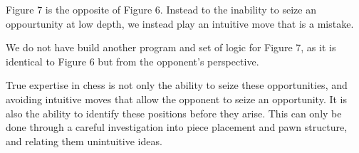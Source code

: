 \documentclass{article}
\begin{document}
Figure 7 is the opposite of Figure 6. Instead to the inability to seize an oppourtunity at low depth, we instead play an intuitive move that is a mistake.

We do not have build another program and set of logic for Figure 7, as it is identical to Figure 6 but from the opponent's perspective.

True expertise in chess is not only the ability to seize these opportunities, and avoiding intuitive moves that allow the opponent to seize an opportunity. It is also the ability to identify these positions before they arise. This can only be done through a careful investigation into piece placement and pawn structure, and relating them unintuitive ideas.
\end{document}
